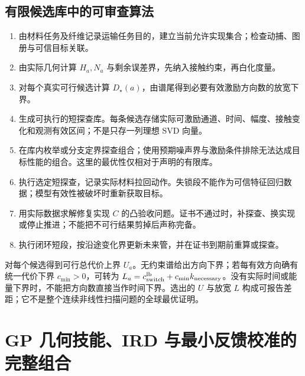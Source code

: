 \documentclass[11pt,a4paper]{article}
\numberwithin{equation}{section}
\theoremstyle{definition}
\begin{document}
\subsection{有限候选库中的可审查算法}
\begin{enumerate}
\item 由材料任务及纤维记录运输任务目的，建立当前允许实现集合；检查动捕、图册与可信目标关联。
\item 由实际几何计算 $H_a,N_a$ 与剩余误差界，先纳入接触约束，再白化度量。
\item 对每个真实可行候选计算 $D_\star(a)$，由谱尾得到必要有效激励方向数的放宽下界。
\item 生成可执行的短探查库。每条候选存储实际可激励通道、时间、幅度、接触变化和观测有效区间；不是只存一列理想 SVD 向量。
\item 在库内枚举或分支定界探查组合；使用预期噪声界与激励条件排除无法达成目标性能的组合。这里的最优性仅相对于声明的有限库。
\item 执行选定短探查，记录实际材料拉回动作。失锁段不能作为可信特征回归数据；模型有效性被破坏时重新获取目标。
\item 用实际数据求解修复实现 $C$ 的凸验收问题。证书不通过时，补探查、换实现或停止推进；不能把不可行结果剪掉后声称完备。
\item 执行闭环短段，按沿途变化界更新未来管，并在证书到期前重算或探查。
\end{enumerate}
对每个候选得到可行总代价上界 $U_a$。无约束谱给出方向下界；若每有效方向确有统一代价下界 $c_{\min}>0$，可转为 $L_a=c_{\rm switch}^{\rm lb}+c_{\min}k_{\rm necessary}$。没有实际时间或能量下界时，不能把方向数直接当作时间下界。选出的 $U$ 与放宽 $L$ 构成可报告差距；它不是整个连续非线性扫描问题的全球最优证明。

\section{GP 几何技能、IRD 与最小反馈校准的完整组合}
\label{sec:v43:integration}
\end{document}
